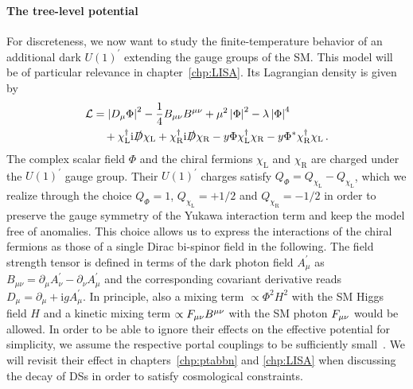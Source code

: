 \paragraph{The tree-level potential} For discreteness, we now want to study the finite-temperature behavior of an additional dark $U(1)^\prime$ extending the gauge groups of the \ac{SM}. This model will be of  particular relevance in chapter~\ref{chp:LISA}. Its Lagrangian density is given by
\begin{align}
	\mathcal{L} &= \left|D_\mu \Phi \right|^2 - \frac{1}{4} B_{\mu \nu}B^{\mu \nu}  + \mu^2 \left|\Phi\right|^2 - \lambda \left|\Phi\right|^4 \nonumber\\
	&\quad + \chi_\text{L}^\dagger \mathrm{i} \slashed{D} \chi_\text{L} + \chi_\text{R}^\dagger \mathrm{i} \slashed{D} \chi_\text{R}  - y \Phi \chi_\text{L}^\dagger \chi_\text{R} - y \Phi^* \chi_\text{R}^\dagger \chi_\text{L} \, .
	\label{eq:toylagrangian}
\end{align}
The complex scalar field $\Phi$ and the chiral fermions $\chi_\text{L}$ and $\chi_\text{R}$ are charged under the $U(1)^\prime$ gauge group. Their $U(1)^\prime$ charges satisfy $Q_\Phi = Q_{ \chi_\text{L}} - Q_{ \chi_\text{L}}$, which we realize through the choice $Q_\Phi = 1$, $Q_{\chi_\text{L}}  = + 1/2$ and $Q_{\chi_\text{R}}= - 1/2$ in order to preserve the gauge symmetry of the Yukawa interaction term and keep the model free of anomalies. This choice allows us to express the interactions of the chiral fermions as those of a single Dirac bi-spinor field in the following. The field strength tensor is defined in terms of the dark photon field $A_\mu^\prime$ as $B_{\mu \nu} = \partial_\mu A^\prime_\nu - \partial_\nu A_\mu^\prime$ and the corresponding covariant derivative reads $D_\mu = \partial_\mu + \mathrm{i} g A^\prime_\mu$. In principle, also a   mixing term $\propto \Phi^2 H^2$ with the \ac{SM} Higgs field $H$ and a kinetic mixing term $\propto F_{{\mu \nu}} B^{{\mu \nu}}$ with the \ac{SM} photon $F_{{\mu \nu}}$ would be allowed. In order to be able to ignore their effects on the effective potential for simplicity, we assume the respective portal couplings to be sufficiently small~\cite{Ilten:2018crw,Bauer:2018onh, Ferber:2023iso}. We will revisit their effect in chapters~\ref{chp:ptabbn} and \ref{chp:LISA} when discussing the decay of \acp{DS} in order to satisfy cosmological constraints.

